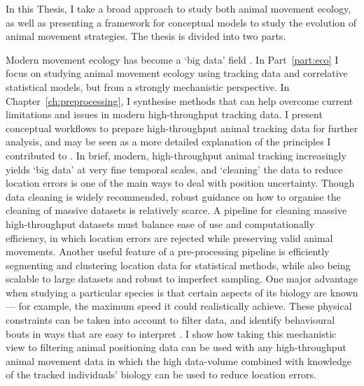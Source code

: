 In this Thesis, I take a broad approach to study both animal movement ecology, as well as presenting a framework for conceptual models to study the evolution of animal movement strategies. The thesis is divided into two parts.

\medskip

Modern movement ecology has become a `big data' field \parencite{nathan2022}.
In Part~\ref{part:eco} I focus on studying animal movement ecology using tracking data and correlative statistical models, but from a strongly mechanistic perspective.
In Chapter~\ref{ch:preprocessing}, I synthesise methods that can help overcome current limitations and issues in modern high-throughput tracking data.
I present conceptual workflows to prepare high-throughput animal tracking data for further analysis, and may be seen as a more detailed explanation of the principles I contributed to \parencite{nathan2022}.
In brief, modern, high-throughput animal tracking increasingly yields `big data' at very fine temporal scales, and `cleaning' the data to reduce location errors is one of the main ways to deal with position uncertainty.
Though data cleaning is widely recommended, robust guidance on how to organise the cleaning of massive datasets is relatively scarce.
A pipeline for cleaning massive high-throughput datasets must balance ease of use and computationally efficiency, in which location errors are rejected while preserving valid animal movements. 
Another useful feature of a pre-processing pipeline is efficiently segmenting and clustering location data for statistical methods, while also being scalable to large datasets and robust to imperfect sampling.
One major advantage when studying a particular species is that certain aspects of its biology are known --- for example, the maximum speed it could realistically achieve.
These physical constraints can be taken into account to filter data, and identify behavioural bouts in ways that are easy to interpret \parencite[][]{barraquand2008}.
I show how taking this mechanistic view to filtering animal positioning data can be used with any high-throughput animal movement data in which the high data-volume combined with knowledge of the tracked individuals' biology can be used to reduce location errors.

